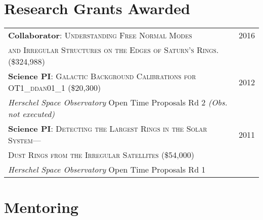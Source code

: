 \documentclass[10pt]{article} %
\begin{document}
{%

\section{Research Grants Awarded}

\begin{tabular}{l>{\hfill}p{2.45cm}}
{\bf Collaborator}: \textsc{Understanding Free Normal Modes} & 2016 \\
\textsc{ and Irregular Structures on the Edges of Saturn's Rings.} \footnotesize(\$324,988)\normalsize \\
{\bf Science PI}: \textsc{Galactic Background Calibrations for OT1\_ddan01\_1} \footnotesize(\$20,300)\normalsize & 2012 \\
{\it Herschel Space Observatory} Open Time Proposals Rd 2 {\it (Obs. not executed)} \\
{\bf Science PI}: \textsc{Detecting the Largest Rings in the Solar System---} & 2011 \\ 
\textsc{Dust Rings from the Irregular Satellites} \footnotesize(\$54,000)\normalsize \\
{\it Herschel Space Observatory} Open Time Proposals Rd 1 \\
\end{tabular}


\section{Mentoring}

\begin{tabular}{r|p{9.9cm}r}


\end{tabular}}
\end{document}
